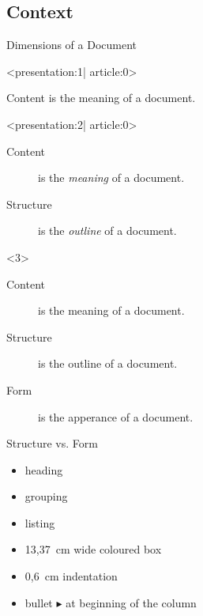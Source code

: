 
\subsection{Context}

\begin{frame}{Dimensions of a Document}
  \begin{onlyenv}<presentation:1| article:0>
    \begin{center}
      Content is the meaning of a document.
    \end{center}
  \end{onlyenv}
  \begin{onlyenv}<presentation:2| article:0>
    \begin{description}
      \item[\textnormal{\color{black}Content}] is the \emph{meaning} of a document.
      \item[\textnormal{\color{black}Structure}] is the \emph{outline }  of a document.
    \end{description}
  \end{onlyenv}
  \begin{onlyenv}<3>
    \begin{description}
      \item[Content] is the \alert{meaning}  of a document.
      \item[Structure] is the \alert{outline}  of a document.
      \item[Form] is the \alert{apperance} of a document.
    \end{description}
  \end{onlyenv}
\end{frame}

\begin{frame}{Structure vs. Form}
  \begin{Beispiele}[Structure]
    \begin{itemize}
      \item heading
      \item grouping
      \item listing
    \end{itemize}
  \end{Beispiele}

  \xxx

  \begin{Beispiele}[Form]
    \begin{itemize}
      \item 13{,}37~cm wide coloured box
      \item 0{,}6~cm indentation
      \item bullet $\blacktriangleright$ at beginning of the column
    \end{itemize}
  \end{Beispiele}
\end{frame}

